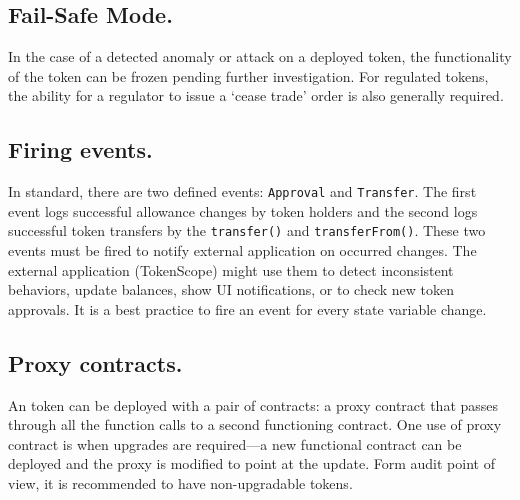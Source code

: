 \subsection{Fail-Safe Mode.}\label{subsec:failsf}

In the case of a detected anomaly or attack on a deployed \erc token, the functionality of the token can be frozen pending further investigation. For regulated tokens, the ability for a regulator to issue a `cease trade' order is also generally required. 

\subsection{Firing events.}\label{subsec:evnts}

In \erc standard, there are two defined events: \texttt{Approval} and \texttt{Transfer}. The first event logs successful allowance changes by token holders and the second logs successful token transfers by the \texttt{transfer()} and \texttt{transferFrom()}. These two events must be fired to notify external application on occurred changes. The external application (\eg TokenScope\cite{TokenScope}) might use them to detect inconsistent behaviors, update balances, show UI notifications, or to check new token approvals. It is a best practice to fire an event for every state variable change.

%

\subsection{Proxy contracts.}\label{subsec:prxy}

An \erc token can be deployed with a pair of contracts: a proxy contract that passes through all the function calls to a second functioning \erc contract\cite{ProxyContract,ProxyPatterns}. One use of proxy contract is when upgrades are required---a new functional contract can be deployed and the proxy is modified to point at the update. Form audit point of view, it is recommended to have non-upgradable \erc tokens. 

